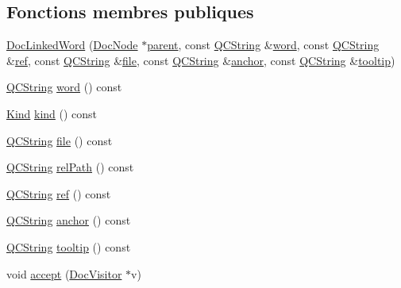 \subsection*{Fonctions membres publiques}
\begin{DoxyCompactItemize}
\item 
\hyperlink{class_doc_linked_word_a95fe3314f15756695072183c9d0f28c1}{Doc\+Linked\+Word} (\hyperlink{class_doc_node}{Doc\+Node} $\ast$\hyperlink{class_doc_node_a990d8b983962776a647e6231d38bd329}{parent}, const \hyperlink{class_q_c_string}{Q\+C\+String} \&\hyperlink{class_doc_linked_word_af8e430f55c199a9c4c5972fcf659f167}{word}, const \hyperlink{class_q_c_string}{Q\+C\+String} \&\hyperlink{class_doc_linked_word_a179128b508a37fe1fcd5e9bfb4b3ab5f}{ref}, const \hyperlink{class_q_c_string}{Q\+C\+String} \&\hyperlink{class_doc_linked_word_ac1ff55cc070d071a78d2acb2ab5103f9}{file}, const \hyperlink{class_q_c_string}{Q\+C\+String} \&\hyperlink{class_doc_linked_word_a259c5abca3d9cf0270af45e96c8cc42a}{anchor}, const \hyperlink{class_q_c_string}{Q\+C\+String} \&\hyperlink{class_doc_linked_word_a655f768ed3357c16d931fed57fa493f6}{tooltip})
\item 
\hyperlink{class_q_c_string}{Q\+C\+String} \hyperlink{class_doc_linked_word_af8e430f55c199a9c4c5972fcf659f167}{word} () const 
\item 
\hyperlink{class_doc_node_aebd16e89ca590d84cbd40543ea5faadb}{Kind} \hyperlink{class_doc_linked_word_a3e45d2549b26f57524fee9147c3d2641}{kind} () const 
\item 
\hyperlink{class_q_c_string}{Q\+C\+String} \hyperlink{class_doc_linked_word_ac1ff55cc070d071a78d2acb2ab5103f9}{file} () const 
\item 
\hyperlink{class_q_c_string}{Q\+C\+String} \hyperlink{class_doc_linked_word_a89e0ca8d57a432e8df1df812408d606f}{rel\+Path} () const 
\item 
\hyperlink{class_q_c_string}{Q\+C\+String} \hyperlink{class_doc_linked_word_a179128b508a37fe1fcd5e9bfb4b3ab5f}{ref} () const 
\item 
\hyperlink{class_q_c_string}{Q\+C\+String} \hyperlink{class_doc_linked_word_a259c5abca3d9cf0270af45e96c8cc42a}{anchor} () const 
\item 
\hyperlink{class_q_c_string}{Q\+C\+String} \hyperlink{class_doc_linked_word_a655f768ed3357c16d931fed57fa493f6}{tooltip} () const 
\item 
void \hyperlink{class_doc_linked_word_a0b72d6562825d9af44811eff41dd0600}{accept} (\hyperlink{class_doc_visitor}{Doc\+Visitor} $\ast$v)
\end{DoxyCompactItemize}
